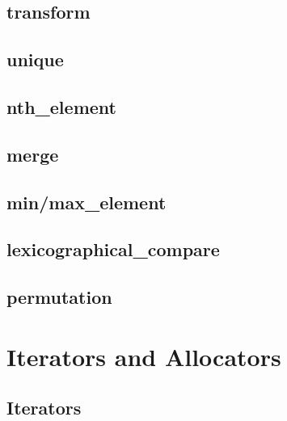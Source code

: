 \documentclass[11pt,a4paper]{article}
\begin{document}
\subsection{transform}
\subsection{unique}
\subsection{nth\_element}
\subsection{merge}
\subsection{min/max\_element}
\subsection{lexicographical\_compare}
\subsection{permutation}

\newpage
\section{Iterators and Allocators}
\subsection{Iterators}
\end{document}
